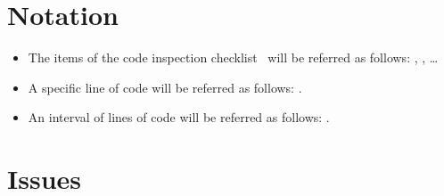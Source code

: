 \section{Notation}
\begin{itemize}
    \item The items of the code inspection checklist~\cite{se-assignment} will be referred as follows: , , \ldots
    \item A specific line of code will be referred as follows: .
    \item An interval of lines of code will be referred as follows: .
\end{itemize}

\section{Issues}
\label{sec:issues}

